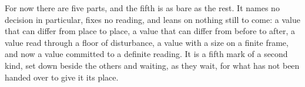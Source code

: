 For now there are five parts, and the fifth is as bare as the rest. It names no decision in particular, fixes no reading, and leans on nothing still to come: a value that can differ from place to place, a value that can differ from before to after, a value read through a floor of disturbance, a value with a size on a finite frame, and now a value committed to a definite reading. It is a fifth mark of a second kind, set down beside the others and waiting, as they wait, for what has not been handed over to give it its place.
